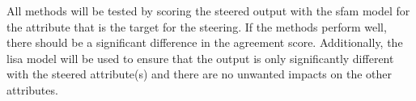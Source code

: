 All methods will be tested by scoring the steered output with the \ac{sfam} model for the attribute that is the target for the steering. If the methods perform well, there should be a significant difference in the agreement score. Additionally, the \ac{lisa} model will be used to ensure that the output is only significantly different with the steered attribute(s) and there are no unwanted impacts on the other attributes.



